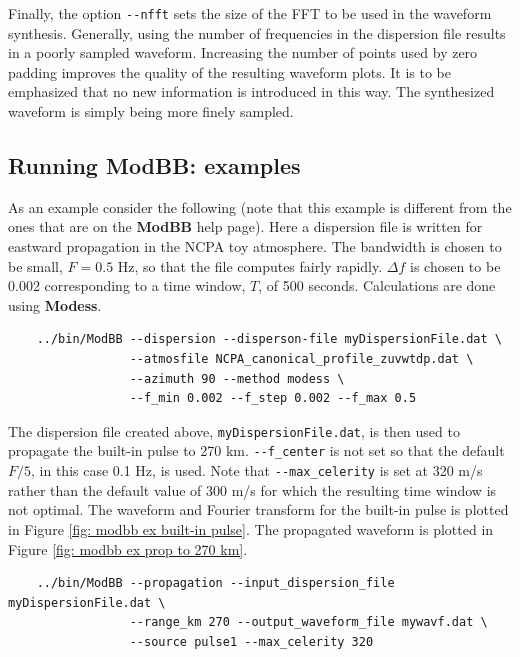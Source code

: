 Finally, the option \verb+--nfft+ sets the size of the FFT to be used in the waveform synthesis. Generally, using the number of frequencies in the dispersion file results in a poorly sampled waveform. Increasing the number of points used by zero padding improves the quality of the resulting waveform plots. It is to be emphasized that no new information is introduced in this way. The synthesized waveform is simply being more finely sampled. 

\subsection{Running ModBB: examples}
\label{sec: modbb examples}

As an example consider the following (note that this example is different from the ones that are on the {\bf ModBB} help page). Here a dispersion file is written for eastward propagation in the NCPA toy atmosphere. The bandwidth is chosen to be small, $F=0.5$ Hz, so that the file computes fairly rapidly. $\Delta f$ is chosen to be 0.002 corresponding to a time window, $T$, of 500 seconds. Calculations are done using {\bf Modess}. 

\begin{verbatim} 
    ../bin/ModBB --dispersion --disperson-file myDispersionFile.dat \
                 --atmosfile NCPA_canonical_profile_zuvwtdp.dat \
                 --azimuth 90 --method modess \
                 --f_min 0.002 --f_step 0.002 --f_max 0.5
\end{verbatim}

The dispersion file created above, \verb+myDispersionFile.dat+, is then used to propagate the built-in pulse to 270 km. \verb+--f_center+ is not set so that the default $F/5$, in this case 0.1 Hz, is used. Note that \verb+--max_celerity+ is set at 320 m/s rather than the default value of 300 m/s for which the resulting time window is not optimal. The waveform and Fourier transform for the built-in pulse is plotted in Figure \ref{fig: modbb ex built-in pulse}. The propagated waveform is plotted in Figure \ref{fig: modbb ex prop to 270 km}. 

\begin{verbatim}
    ../bin/ModBB --propagation --input_dispersion_file myDispersionFile.dat \
                 --range_km 270 --output_waveform_file mywavf.dat \
                 --source pulse1 --max_celerity 320
\end{verbatim}

